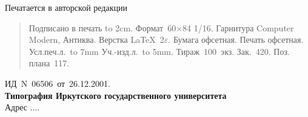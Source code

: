 \documentclass[12pt, openany, twoside]{book} %
\begin{document}
\newpage
\thispagestyle{empty}
\hbox{}
\vfill
\begin{center}
Печатается в авторской редакции\\[1em]
\end{center}
\begin{quote}
\noindent Подписано в печать \hbox to 2cm{}.
Формат~60$\times$84 1/16. Гарнитура Computer Modern, Антиква.
Верстка \LaTeX~2$\varepsilon$.
Бумага офсетная. Печать офсетная. Усл.печ.л.~\hbox to 7mm{}
Уч.-изд.л.~\hbox to 5mm{}. Тираж~100~экз. Зак.~420.
Поз. плана~117.
\end{quote}
\begin{center}
ИД~N~06506~от~26.12.2001.\\
{\bf Типография Иркутского государственного университета}\\
Адрес ....
\end{center}
\end{document}
